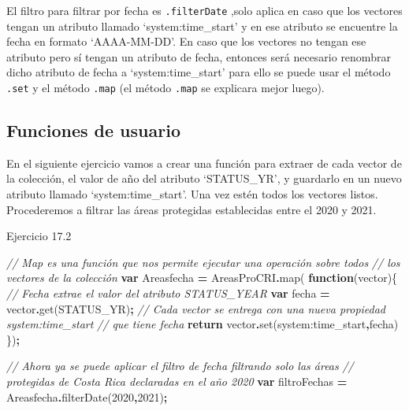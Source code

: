 \documentclass[
  12pt,
  letterpaper,
  twoside]{book}
\newenvironment{Shaded}{\begin{snugshade}}{\end{snugshade}}
\newcommand{\CommentTok}[1]{\textcolor[rgb]{0.56,0.35,0.01}{\textit{#1}}}
\newcommand{\ControlFlowTok}[1]{\textcolor[rgb]{0.13,0.29,0.53}{\textbf{#1}}}
\newcommand{\DecValTok}[1]{\textcolor[rgb]{0.00,0.00,0.81}{#1}}
\newcommand{\FunctionTok}[1]{\textcolor[rgb]{0.00,0.00,0.00}{#1}}
\newcommand{\KeywordTok}[1]{\textcolor[rgb]{0.13,0.29,0.53}{\textbf{#1}}}
\newcommand{\NormalTok}[1]{#1}
\newcommand{\OperatorTok}[1]{\textcolor[rgb]{0.81,0.36,0.00}{\textbf{#1}}}
\newcommand{\StringTok}[1]{\textcolor[rgb]{0.31,0.60,0.02}{#1}}
\begin{document}
El filtro para filtrar por fecha es \texttt{.filterDate} ,solo aplica en caso que los vectores tengan un atributo llamado `system:time\_start' y en ese atributo se encuentre la fecha en formato `AAAA-MM-DD'. En caso que los vectores no tengan ese atributo pero sí tengan un atributo de fecha, entonces será necesario renombrar dicho atributo de fecha a `system:time\_start' para ello se puede usar el método \texttt{.set} y el método \texttt{.map} (el método \texttt{.map} se explicara mejor luego).

\hypertarget{funciones-de-usuario}{%
\subsection{Funciones de usuario}\label{funciones-de-usuario}}

En el siguiente ejercicio vamos a crear una función para extraer de cada vector de la colección, el valor de año del atributo `STATUS\_YR', y guardarlo en un nuevo atributo llamado `system:time\_start'. Una vez estén todos los vectores listos. Procederemos a filtrar las áreas protegidas establecidas entre el 2020 y 2021.

Ejercicio 17.2

\begin{Shaded}
\begin{Highlighting}[]
\CommentTok{// Map es una función que nos permite ejecutar una operación sobre todos }
\CommentTok{// los vectores de la colección}
\KeywordTok{var}\NormalTok{ Areasfecha }\OperatorTok{=}\NormalTok{ AreasProCRI}\OperatorTok{.}\FunctionTok{map}\NormalTok{( }\KeywordTok{function}\NormalTok{(vector)\{ }
  \CommentTok{// Fecha extrae el valor del atributo \textquotesingle{}STATUS\_YEAR\textquotesingle{}}
  \KeywordTok{var}\NormalTok{ fecha }\OperatorTok{=}\NormalTok{ vector}\OperatorTok{.}\FunctionTok{get}\NormalTok{(}\StringTok{\textquotesingle{}STATUS\_YR\textquotesingle{}}\NormalTok{)}\OperatorTok{;}   
  \CommentTok{// Cada vector se entrega con una nueva propiedad \textquotesingle{}system:time\_start\textquotesingle{} }
  \CommentTok{// que tiene fecha}
  \ControlFlowTok{return}\NormalTok{ vector}\OperatorTok{.}\FunctionTok{set}\NormalTok{(}\StringTok{\textquotesingle{}system:time\_start\textquotesingle{}}\OperatorTok{,}\NormalTok{fecha)}
\NormalTok{\})}\OperatorTok{;} 

\CommentTok{// Ahora ya se puede aplicar el filtro de fecha filtrando solo las áreas }
\CommentTok{// protegidas de Costa Rica declaradas en el año 2020}
\KeywordTok{var}\NormalTok{ filtroFechas }\OperatorTok{=}\NormalTok{ Areasfecha}\OperatorTok{.}\FunctionTok{filterDate}\NormalTok{(}\DecValTok{2020}\OperatorTok{,}\DecValTok{2021}\NormalTok{)}\OperatorTok{;} 
\end{Highlighting}
\end{Shaded}
\end{document}
